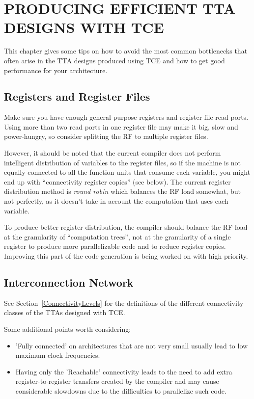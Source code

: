\documentclass[twoside]{tceusermanual}
\begin{document}
\chapter{PRODUCING EFFICIENT TTA DESIGNS WITH TCE}

This chapter gives some tips on how to avoid the most common bottlenecks that
often arise in the TTA designs produced using TCE and how to get good 
performance for your architecture.

\section{Registers and Register Files}

Make sure you have enough general purpose registers and register file 
read ports. Using more than two read ports in one register file may make it 
big, slow and power-hungry, so consider splitting the RF to multiple register files.

However, it should be noted that the current compiler does not perform
intelligent distribution of variables to the register files, so if the machine
is not equally connected to all the function units that consume each variable,
you might end up with ``connectivity register copies'' (see below). The current 
register distribution method is \textit{round robin} which balances the RF load somewhat,
but not perfectly, as it doesn't take in account the computation that uses each 
variable. 

To produce better register distribution, the compiler should balance the RF load at 
the granularity of ``computation trees'', not at the granularity of a single register
to produce more parallelizable code and to reduce register copies. Improving this 
part of the code generation is being worked on with high priority.

\section{Interconnection Network}

See Section~\ref{ConnectivityLevels} for the definitions of the different
connectivity classes of the TTAs designed with TCE.

Some additional points worth considering:

\begin{itemize}
\item
'Fully connected' on architectures that are not very small usually lead to 
low maximum clock frequencies.

\item
Having only the 'Reachable' connectivity leads to the need to add extra
register-to-register transfers created by the compiler and may cause
considerable slowdowns due to the difficulties to parallelize such code.

\end{itemize}
\end{document}
